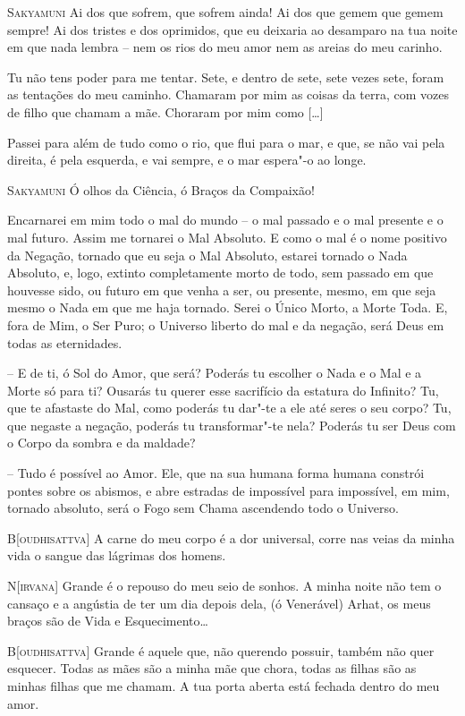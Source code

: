 \textsc{Sakyamuni} Ai dos que sofrem, que sofrem ainda! Ai dos que gemem
que gemem sempre! Ai dos tristes e dos oprimidos, que eu deixaria ao
desamparo na tua noite em que nada lembra -- nem os rios do meu amor
nem as areias do meu carinho.

Tu não tens poder para me tentar. Sete, e dentro de sete, sete vezes
sete, foram as tentações do meu caminho. Chamaram por mim as coisas
da terra, com vozes de filho que chamam a mãe. Choraram por mim como
[\ldots{}]

Passei para além de tudo como o rio, que flui para o mar, e que, se
não vai pela direita, é pela esquerda, e vai sempre, e o mar espera"-o
ao longe.

\textsc{Sakyamuni} Ó olhos da Ciência, ó Braços da Compaixão!

Encarnarei em mim todo o mal do mundo -- o mal passado e o mal presente
e o mal futuro. Assim me tornarei o Mal Absoluto. E como o mal é o
nome positivo da Negação, tornado que eu seja o Mal Absoluto, estarei
tornado o Nada Absoluto, e, logo, extinto completamente morto de
todo, sem passado em que houvesse sido, ou futuro em que venha a ser,
ou presente, mesmo, em que seja mesmo o Nada em que me haja tornado.
Serei o Único Morto, a Morte Toda. E, fora de Mim, o Ser Puro; o
Universo liberto do mal e da negação, será Deus em todas as
eternidades.

-- E de ti, ó Sol do Amor, que será? Poderás tu escolher o Nada e o Mal
e a Morte só para ti? Ousarás tu querer esse sacrifício da estatura
do Infinito? Tu, que te afastaste do Mal, como poderás tu dar"-te a
ele até seres o seu corpo? Tu, que negaste a negação, poderás tu
transformar"-te nela? Poderás tu ser Deus com o Corpo da sombra e da
maldade?

-- Tudo é possível ao Amor. Ele, que na sua humana forma humana
constrói pontes sobre os abismos, e abre estradas de impossível para
impossível, em mim, tornado absoluto, será o Fogo sem Chama
ascendendo todo o Universo.

\textsc{B[oudhisattva]} A carne do meu corpo é a dor universal, corre nas
veias da minha vida o sangue das lágrimas dos homens.

\textsc{N[irvana]} Grande é o repouso do meu seio de sonhos. A minha noite
não tem o cansaço e a angústia de ter um dia depois dela, (ó
Venerável) Arhat, os meus braços são de Vida e Esquecimento\ldots{}

 \textsc{B[oudhisattva]} Grande é aquele que, não querendo possuir, também não
quer esquecer. Todas as mães são a minha mãe que chora, todas as
filhas são as minhas filhas que me chamam. A tua porta aberta está
fechada dentro do meu amor.

